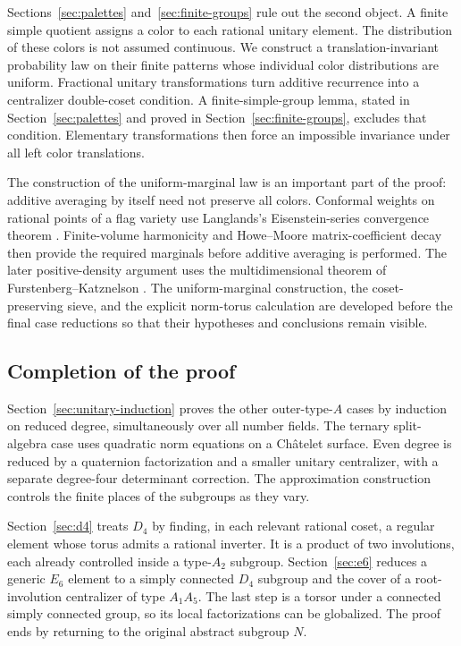 Sections~\ref{sec:palettes} and~\ref{sec:finite-groups} rule out the
second object. A finite simple quotient assigns a color to each rational
unitary element. The distribution of these colors is not assumed
continuous. We construct a translation-invariant probability law on
their finite patterns whose individual color distributions are uniform.
Fractional unitary transformations turn additive recurrence into a
centralizer double-coset condition. A finite-simple-group lemma, stated
in Section~\ref{sec:palettes} and proved in
Section~\ref{sec:finite-groups}, excludes that condition. Elementary
transformations then force an impossible invariance under all left
color translations.

The construction of the uniform-marginal law is an important part of the
proof: additive averaging by itself need not preserve all colors.
Conformal weights on rational points of a flag variety use Langlands's
Eisenstein-series convergence theorem \cite{Langlands}. Finite-volume
harmonicity and Howe--Moore matrix-coefficient decay
\cite{HoweMoore,Ciobotaru} then provide the required marginals before
additive averaging is performed. The later positive-density argument
uses the multidimensional theorem of Furstenberg--Katznelson
\cite{FurstenbergKatznelson}. The uniform-marginal construction, the
coset-preserving sieve, and the explicit norm-torus calculation are
developed before the final case reductions so that their hypotheses and
conclusions remain visible.

\subsection{Completion of the proof}

Section~\ref{sec:unitary-induction} proves the other outer-type-$A$
cases by induction on reduced degree, simultaneously over all number
fields. The ternary split-algebra case uses quadratic norm equations on a
Ch\^atelet surface. Even degree is reduced by a quaternion factorization
and a smaller unitary centralizer, with a separate degree-four determinant
correction. The approximation construction controls the finite places of
the subgroups as they vary.

\enlargethispage{\baselineskip}
Section~\ref{sec:d4} treats $D_4$ by finding, in each relevant rational
coset, a regular element whose torus admits a rational inverter. It is a
product of two involutions, each already controlled inside a type-$A_2$
subgroup. Section~\ref{sec:e6} reduces a generic $E_6$ element to a
simply connected $D_4$ subgroup and the cover of a root-involution
centralizer of type $A_1A_5$. The last step is a torsor under a connected
simply connected group, so its local factorizations can be globalized.
The proof ends by returning to the original abstract subgroup $N$.
